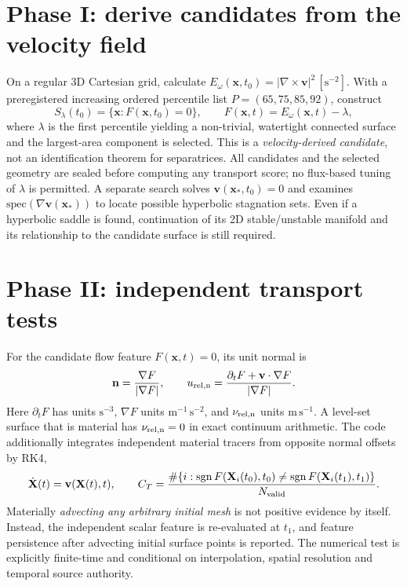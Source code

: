 \documentclass[11pt,a4paper]{article}
\begin{document}
\section{Phase I: derive candidates from the velocity field}
On a regular 3D Cartesian grid, calculate $E_\omega(\mathbf x,t_0)=|\nabla\times\mathbf v|^2\,[\mathrm{s^{-2}}]$. With a preregistered increasing ordered percentile list $P=(65,75,85,92)$, construct
\begin{equation}
 S_\lambda(t_0)=\{\mathbf x: F(\mathbf x,t_0)=0\},\qquad F(\mathbf x,t)=E_\omega(\mathbf x,t)-\lambda,
\end{equation}
where $\lambda$ is the first percentile yielding a non-trivial, watertight connected surface and the largest-area component is selected. This is a \emph{velocity-derived candidate}, not an identification theorem for separatrices. All candidates and the selected geometry are sealed before computing any transport score; no flux-based tuning of $\lambda$ is permitted. A separate search solves $\mathbf v(\mathbf x_*,t_0)=0$ and examines $\mathrm{spec}(\nabla\mathbf v(\mathbf x_*))$ to locate possible hyperbolic stagnation sets. Even if a hyperbolic saddle is found, continuation of its 2D stable/unstable manifold and its relationship to the candidate surface is still required.

\section{Phase II: independent transport tests}
For the candidate flow feature $F(\mathbf x,t)=0$, its unit normal is
\begin{equation}
\mathbf n=\frac{\nabla F}{|\nabla F|},\qquad
u_{\rm rel,n}=\frac{\partial_t F+\mathbf v\cdot\nabla F}{|\nabla F|}.
\end{equation}
Here $\partial_tF$ has units $\mathrm{s^{-3}}$, $\nabla F$ units $\mathrm{m^{-1}\,s^{-2}}$, and $\nu_{\rm rel,n}$ units $\mathrm{m\,s^{-1}}$. A level-set surface that is material has $\nu_{\rm rel,n}=0$ in exact continuum arithmetic. The code additionally integrates independent material tracers from opposite normal offsets by RK4,
\begin{equation}
\dot{\mathbf X}(t)=\mathbf v(\mathbf X(t),t),\qquad
C_T=\frac{\#\{i:\operatorname{sgn}F(\mathbf X_i(t_0),t_0)\ne\operatorname{sgn}F(\mathbf X_i(t_1),t_1)\}}{N_{\rm valid}}.
\end{equation}
Materially \emph{advecting any arbitrary initial mesh} is not positive evidence by itself. Instead, the independent scalar feature is re-evaluated at $t_1$, and feature persistence after advecting initial surface points is reported. The numerical test is explicitly finite-time and conditional on interpolation, spatial resolution and temporal source authority.
\end{document}
